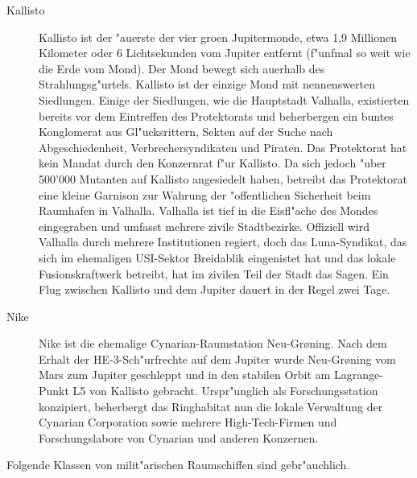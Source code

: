 \begin{description}
\item [Kallisto] Kallisto ist der "au\3erste der vier gro\3en Jupitermonde, etwa 1,9 Millionen Kilometer oder 6 Lichtsekunden vom Jupiter 
      entfernt (f"unfmal so weit wie die Erde vom Mond). Der Mond bewegt sich au\3erhalb des Strahlungsg"urtels. Kallisto ist der einzige Mond mit nennenswerten Siedlungen. Einige der Siedlungen, wie die Hauptstadt Valhalla, existierten bereits vor dem Eintreffen des Protektorats und beherbergen ein buntes Konglomerat aus Gl"ucksrittern, Sekten auf der Suche nach Abgeschiedenheit, Verbrechersyndikaten und Piraten. Das Protektorat hat kein Mandat durch den Konzernrat f"ur Kallisto. Da sich jedoch "uber 500'000 Mutanten auf Kallisto angesiedelt haben, betreibt das Protektorat eine kleine Garnison zur Wahrung der "offentlichen Sicherheit beim Raumhafen in Valhalla. Valhalla ist tief in die Eisfl"ache des Mondes eingegraben und umfasst mehrere zivile Stadtbezirke. Offiziell wird Valhalla durch mehrere Institutionen regiert, doch das Luna-Syndikat, das sich im ehemaligen USI-Sektor Breidablik eingenistet hat und das lokale Fusionskraftwerk betreibt, hat im zivilen Teil der Stadt das Sagen. Ein Flug zwischen Kallisto und dem Jupiter dauert in der Regel zwei Tage.
\item [Nike]  Nike ist die ehemalige Cynarian-Raumstation Neu-Gr{\o}ning. Nach dem Erhalt der HE-3-Sch"urfrechte auf dem 
      Jupiter wurde Neu-Gr{\o}ning vom Mars zum Jupiter geschleppt und in den stabilen Orbit am Lagrange-Punkt L5 von Kallisto gebracht. Urspr"unglich als Forschungsstation konzipiert, beherbergt das Ringhabitat nun die lokale Verwaltung der Cynarian Corporation sowie mehrere High-Tech-Firmen und Forschungslabore von Cynarian und anderen Konzernen.
\end{description}


Folgende Klassen von milit"arischen Raumschiffen sind gebr"auchlich.

